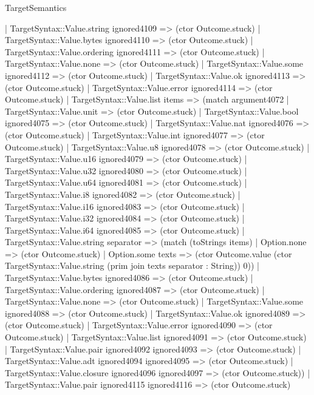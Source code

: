 \begin{lexlean}{TargetSemantics}
\begin{semanticmodule}
{            | TargetSyntax::Value.string ignored4109 => (ctor Outcome.stuck)
            | TargetSyntax::Value.bytes ignored4110 => (ctor Outcome.stuck)
            | TargetSyntax::Value.ordering ignored4111 => (ctor Outcome.stuck)
            | TargetSyntax::Value.none => (ctor Outcome.stuck)
            | TargetSyntax::Value.some ignored4112 => (ctor Outcome.stuck)
            | TargetSyntax::Value.ok ignored4113 => (ctor Outcome.stuck)
            | TargetSyntax::Value.error ignored4114 => (ctor Outcome.stuck)
            | TargetSyntax::Value.list items => (match argument4072
              | TargetSyntax::Value.unit => (ctor Outcome.stuck)
              | TargetSyntax::Value.bool ignored4075 => (ctor Outcome.stuck)
              | TargetSyntax::Value.nat ignored4076 => (ctor Outcome.stuck)
              | TargetSyntax::Value.int ignored4077 => (ctor Outcome.stuck)
              | TargetSyntax::Value.u8 ignored4078 => (ctor Outcome.stuck)
              | TargetSyntax::Value.u16 ignored4079 => (ctor Outcome.stuck)
              | TargetSyntax::Value.u32 ignored4080 => (ctor Outcome.stuck)
              | TargetSyntax::Value.u64 ignored4081 => (ctor Outcome.stuck)
              | TargetSyntax::Value.i8 ignored4082 => (ctor Outcome.stuck)
              | TargetSyntax::Value.i16 ignored4083 => (ctor Outcome.stuck)
              | TargetSyntax::Value.i32 ignored4084 => (ctor Outcome.stuck)
              | TargetSyntax::Value.i64 ignored4085 => (ctor Outcome.stuck)
              | TargetSyntax::Value.string separator => (match (toStrings items)
                | Option.none => (ctor Outcome.stuck)
                | Option.some texts => (ctor Outcome.value (ctor TargetSyntax::Value.string (prim join texts separator : String)) 0))
              | TargetSyntax::Value.bytes ignored4086 => (ctor Outcome.stuck)
              | TargetSyntax::Value.ordering ignored4087 => (ctor Outcome.stuck)
              | TargetSyntax::Value.none => (ctor Outcome.stuck)
              | TargetSyntax::Value.some ignored4088 => (ctor Outcome.stuck)
              | TargetSyntax::Value.ok ignored4089 => (ctor Outcome.stuck)
              | TargetSyntax::Value.error ignored4090 => (ctor Outcome.stuck)
              | TargetSyntax::Value.list ignored4091 => (ctor Outcome.stuck)
              | TargetSyntax::Value.pair ignored4092 ignored4093 => (ctor Outcome.stuck)
              | TargetSyntax::Value.adt ignored4094 ignored4095 => (ctor Outcome.stuck)
              | TargetSyntax::Value.closure ignored4096 ignored4097 => (ctor Outcome.stuck))
            | TargetSyntax::Value.pair ignored4115 ignored4116 => (ctor Outcome.stuck)
}
\end{semanticmodule}
\end{lexlean}
